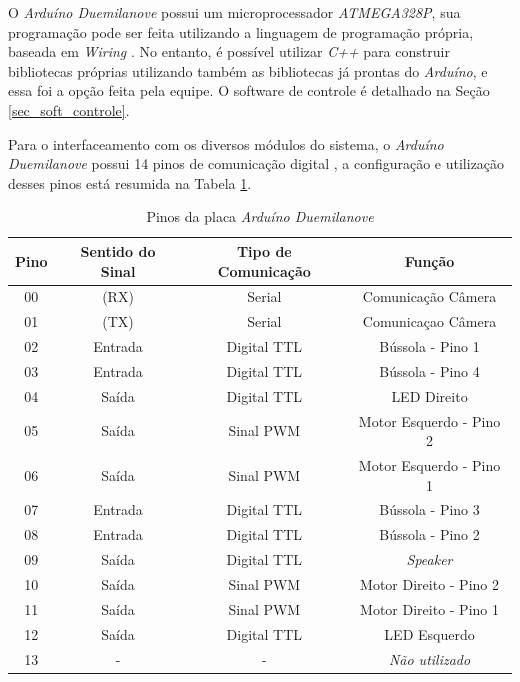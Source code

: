 O \textit{Arduíno Duemilanove} possui um microprocessador \textit{ATMEGA328P}, sua programação pode ser feita utilizando a linguagem de programação própria, baseada em \textit{Wiring} \cite{arduino1}. No entanto, é possível utilizar \textit{C++} para construir bibliotecas próprias utilizando também as bibliotecas já prontas do \textit{Arduíno}, e essa foi a opção feita pela equipe. O software de controle é detalhado na Seção \ref{sec_soft_controle}.

Para o interfaceamento com os diversos módulos do sistema, o \textit{Arduíno Duemilanove} possui 14 pinos de comunicação digital \cite{arduino2}, a configuração e utilização desses pinos está resumida na Tabela \ref{int_tbl02}.

\begin{table}[h!]
    \centering
    \begin{tabular}{|c|c|c|c|} \hline
        \textbf{Pino} & \textbf{Sentido do Sinal} & \textbf{Tipo de Comunicação} & \textbf{Função} \\ \hline
        00 & (RX) & Serial & Comunicação Câmera \\ \hline
        01 & (TX) & Serial & Comunicaçao Câmera \\ \hline
        02 & Entrada & Digital TTL & Bússola - Pino 1 \\ \hline
        03 & Entrada & Digital TTL & Bússola - Pino 4 \\ \hline
        04 & Saída & Digital TTL &LED Direito \\ \hline
        05 & Saída & Sinal PWM & Motor Esquerdo - Pino 2 \\ \hline
        06 & Saída & Sinal PWM & Motor Esquerdo - Pino 1 \\ \hline
        07 & Entrada & Digital TTL & Bússola - Pino 3 \\ \hline
        08 & Entrada & Digital TTL & Bússola - Pino 2 \\ \hline
        09 & Saída & Digital TTL & \textit{Speaker} \\ \hline
        10 & Saída & Sinal PWM & Motor Direito - Pino 2 \\ \hline
        11 & Saída & Sinal PWM & Motor Direito - Pino 1 \\ \hline
        12 & Saída & Digital TTL & LED Esquerdo \\ \hline
        13 & - & - & \textit{Não utilizado} \\ \hline
    \end{tabular}
    \caption{Pinos da placa \textit{Arduíno Duemilanove}}
    \label{int_tbl02}
\end{table}

